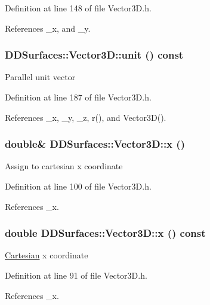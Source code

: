 Definition at line 148 of file Vector3D.h.

References \_\-x, and \_\-y.\hypertarget{class_d_d_surfaces_1_1_vector3_d_a549d743110d470a18044d8921d7afa44}{
\subsubsection[{unit}]{ DDSurfaces::Vector3D::unit () const}}
\label{class_d_d_surfaces_1_1_vector3_d_a549d743110d470a18044d8921d7afa44}
Parallel unit vector 

Definition at line 187 of file Vector3D.h.

References \_\-x, \_\-y, \_\-z, r(), and Vector3D().\hypertarget{class_d_d_surfaces_1_1_vector3_d_a42067b3c5580bcb067a91e27c0c99352}{
\subsubsection[{x}]{\setlength{\rightskip}{0pt plus 5cm}double\& DDSurfaces::Vector3D::x ()}}
\label{class_d_d_surfaces_1_1_vector3_d_a42067b3c5580bcb067a91e27c0c99352}
Assign to cartesian x coordinate 

Definition at line 100 of file Vector3D.h.

References \_\-x.\hypertarget{class_d_d_surfaces_1_1_vector3_d_a5bd719fa589abb81c0516d64bb0845d5}{
\subsubsection[{x}]{\setlength{\rightskip}{0pt plus 5cm}double DDSurfaces::Vector3D::x () const}}
\label{class_d_d_surfaces_1_1_vector3_d_a5bd719fa589abb81c0516d64bb0845d5}
\hyperlink{struct_d_d_surfaces_1_1_vector3_d_1_1_cartesian}{Cartesian} x coordinate 

Definition at line 91 of file Vector3D.h.

References \_\-x.

